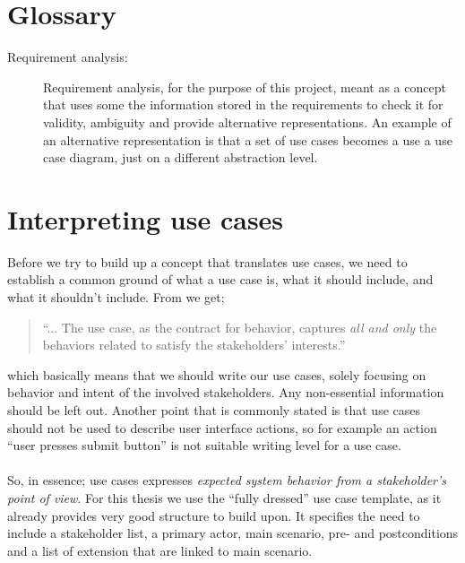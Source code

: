 \section{Glossary}
\begin{description}
  \item[Requirement analysis:] Requirement analysis, for the purpose of this project, meant as a concept that uses some the information stored in the requirements to check it for validity, ambiguity and provide alternative representations. An example of an alternative representation is that a set of use cases becomes a use a use case diagram, just on a different abstraction level.

\end{description}

\section{Interpreting use cases}
Before we try to build up a concept that translates use cases, we need to establish a common ground of what a use case is, what it should include, and what it shouldn't include. From \cite{cockburn2000} we get;
\begin{quote}
``... The use case, as the contract for behavior, captures \emph{all and only} the behaviors related to satisfy the stakeholders’ interests.''
\end{quote}which basically means that we should write our use cases, solely focusing on behavior and intent of the involved stakeholders. Any non-essential information should be left out. Another point that is commonly stated is that use cases should not be used to describe user interface actions, so for example an action ``user presses submit button'' is not suitable writing level for a use case.\\\\
So, in essence; use cases expresses \emph{expected system behavior from a stakeholder's point of view}. For this thesis we use the ``fully dressed'' use case template\cite{larman2005}, as it already provides very good structure to build upon. It specifies the need to include a stakeholder list, a primary actor, main scenario, pre- and postconditions and a list of extension that are linked to main scenario.

